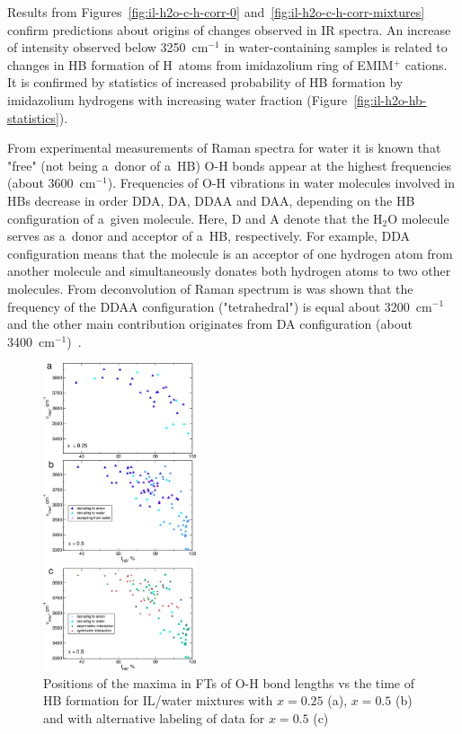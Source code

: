 Results from Figures~\ref{fig:il-h2o-c-h-corr-0} and~\ref{fig:il-h2o-c-h-corr-mixtures} confirm predictions about origins of changes observed in IR spectra. An increase of intensity observed below 3250~cm$^{-1}$ in water-containing samples is related to changes in HB formation of H~atoms from imidazolium ring of EMIM$^{+}$ cations. It is confirmed by statistics of increased probability of HB formation by imidazolium hydrogens with increasing water fraction (Figure~\ref{fig:il-h2o-hb-statistics}).

From experimental measurements of Raman spectra for water it is known that "free" (not being a~donor of a~HB) O-H bonds appear at the highest frequencies (about 3600~cm$^{-1}$). Frequencies of O-H vibrations in water molecules involved in HBs decrease in order DDA, DA, DDAA and DAA, depending on the HB configuration of a~given molecule. Here, D and A denote that the H$_2$O molecule serves as a~donor and acceptor of a~HB, respectively. For example, DDA configuration means that the molecule is an acceptor of one hydrogen atom from another molecule and simultaneously donates both hydrogen atoms to two other molecules. From deconvolution of Raman spectrum is was shown that the frequency of the DDAA configuration ("tetrahedral") is equal about 3200~cm$^{-1}$ and the other main contribution originates from DA configuration (about 3400~cm$^{-1}$)~\cite{h2o-bands-raman}.

\begin{figure}[ht]
    \centering
    \includegraphics[width=0.4\textwidth]{img/4-ir-spectra-from-aimd-simulations/4-il-h2o/o-h-corr-mixtures.png}
    \caption{Positions of the maxima in FTs of O-H bond lengths vs the time of HB formation for IL/water mixtures with $x = 0.25$ (a), $x = 0.5$ (b) and with alternative labeling of data for $x = 0.5$ (c)}
    \label{fig:il-h2o-o-h-corr-mixtures}
\end{figure}

